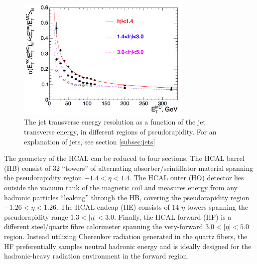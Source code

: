  \begin{figure}
	\centering
	\includegraphics[width=0.75\textwidth]{detector/figs/jetEnergyRes}
	\renewcommand{\baselinestretch}{1.0}
	\caption[The jet transverse energy resolution as a function of the jet transverse energy, in different regions of pseudorapidity.]{The jet transverse energy resolution as a function of the jet transverse energy, in different regions of pseudorapidity. For an explanation of jets, see section \ref{subsec:jets}}
	\label{fig:hcalSigma}
\end{figure}

The geometry of the HCAL can be reduced to four sections. The HCAL barrel (HB) consist of 32 ``towers'' of alternating absorber/scintillator material spanning the pseudorapidity region $-1.4<\eta<1.4$. The HCAL outer (HO) detector lies outside the vacuum tank of the magnetic coil and measures energy from any hadronic particles ``leaking'' through the HB, covering the pseudorapidity region $-1.26<\eta<1.26$. The HCAL endcap (HE) consists of 14 $\eta$ towers spanning the pseudorapidity range $1.3<|\eta|<3.0$. Finally, the HCAL forward (HF) is a different steel/quartz fibre calorimeter spanning the very-forward $3.0<|\eta|<5.0$ region. Instead utilizing Cherenkov radiation generated in the quartz fibers, the HF preferentially samples neutral hadronic energy and is ideally designed for the hadronic-heavy radiation environment in the forward region.

